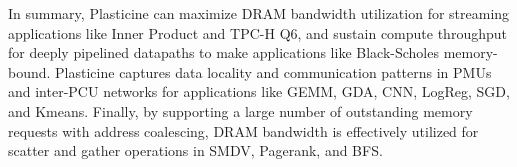 In summary, Plasticine can maximize DRAM bandwidth utilization for streaming applications like Inner Product and TPC-H Q6, and
sustain compute throughput for deeply pipelined datapaths to make applications like Black-Scholes memory-bound. Plasticine captures data locality
and communication patterns in PMUs and inter-PCU networks for applications like GEMM, GDA, CNN, LogReg, SGD, and Kmeans. Finally, by supporting a
large number of outstanding memory requests with address coalescing, DRAM bandwidth is effectively utilized for scatter and gather operations
in SMDV, Pagerank, and BFS.





